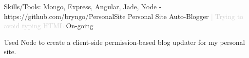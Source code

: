 \begin{cventries}

  \cventry
  {Skills/Tools: Mongo, Express, Angular, Jade, Node - https://github.com/bryngo/PersonalSite} %
  {Personal Site Auto-Blogger \textcolor{lightgray}{| Trying to avoid typing HTML}} %
  {} %
  {On-going} %
  {
  \begin{cvitems} %
    \item {Used Node to create a client-side permission-based blog updater for my personal site.}
  \end{cvitems}
  }


\end{cventries}
